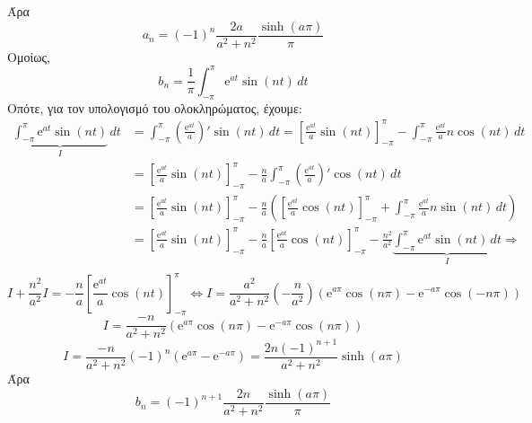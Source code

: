 \documentclass[a4paper,table]{report}
\begin{document}
\begin{solution}
\[  \] 
  Άρα 
  \[
    a_{n} = (-1)^{n}\frac{2a}{a^{2}+n^{2}} \frac{\sinh{(a \pi)}}{\pi}
  \] 
  Ομοίως, 
  \[
    b_{n} = \frac{1}{\pi} \int_{-\pi}^{\pi} \mathrm{e}^{at} \sin{(nt)} \,{dt}
  \]
  Οπότε, για τον υπολογισμό του ολοκληρώματος, έχουμε:
  \begin{align*}
    \underbrace{\int_{-\pi}^{\pi} \mathrm{e}^{at} \sin{(nt)}}_{I} \,{dt} 
    &= \int_{-\pi}^{\pi} \left(\frac{\mathrm{e}^{at}}{a} \right)' \sin{(nt)}\,{dt} 
    = \left[\frac{\mathrm{e}^{at}}{a} \sin{(nt)} 
    \right]_{- \pi }^{\pi} - \int_{-\pi}^{\pi} \frac{\mathrm{e}^{at}}{a} n \cos{(nt)}
    \,{dt} \\
    &= \left[\frac{\mathrm{e}^{at}}{a} \sin{(nt)} 
    \right]_{- \pi }^{\pi} - \frac{n}{a}  \int_{-\pi}^{\pi}
    \left(\frac{\mathrm{e}^{at}}{a}\right)' \cos{(nt)} \,{dt} \\
    &= \left[\frac{\mathrm{e}^{at}}{a} \sin{(nt)} 
    \right]_{- \pi }^{\pi} - \frac{n}{a} 
    \left(\left[\frac{\mathrm{e}^{at}}{a} \cos{(nt)} 
      \right]_{- \pi }^{\pi }+\int_{-\pi}^{\pi} \frac{\mathrm{e}^{at}}{a} n 
    \sin{(nt)} \,{dt}\right) \\ 
    &= \left[\frac{\mathrm{e}^{at}}{a} \sin{(nt)} 
    \right]_{- \pi }^{\pi} - \frac{n}{a} 
    \left[\frac{\mathrm{e}^{at}}{a} \cos{(nt)} 
    \right]_{- \pi }^{\pi }- \frac{n^{2}}{a^{2}}
    \underbrace{\int_{-\pi}^{\pi}
    \mathrm{e}^{at} \sin{(nt)} \,{dt}}_{I} \Rightarrow \\ 
  \end{align*}
  \[
    I+ \frac{n^{2}}{a^{2}} I = - \frac{n}{a} \left[\frac{\mathrm{e}^{at}}{a} \cos{(nt)} 
    \right]_{- \pi }^{\pi} \Leftrightarrow 
    I = \frac{a^{2}}{a^{2}+n^{2}} \left(-\frac{n}{a^{2}}\right)
    \left(\mathrm{e}^{a \pi} \cos{(n \pi)} - \mathrm{e}^{-a \pi} \cos{(-n \pi)}\right)
  \]
  \[
    I = \frac{-n}{a^{2}+n^{2}} \left(\mathrm{e}^{a \pi} \cos{(n \pi)} - \mathrm{e}^{-a \pi} \cos{(n \pi)}\right)
  \] 
  \[
    I = \frac{-n}{a^{2}+n^{2}} (-1)^{n} \left(\mathrm{e}^{a \pi} - 
    \mathrm{e}^{-a \pi}\right) = \frac{2n(-1)^{n+1}}{a^{2}+n^{2}} \sinh{(a \pi)} 
  \] 
  Άρα 
  \[
    b_{n} = (-1)^{n+1}\frac{2n}{a^{2}+n^{2}} \frac{\sinh{(a \pi)}}{\pi}
  \] 
\end{solution}
\end{document}
